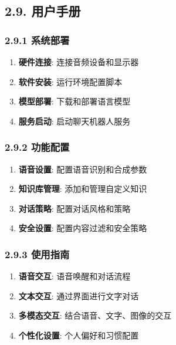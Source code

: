 \subsection{2.9. 用户手册}\label{ux7528ux6237ux624bux518c}

\subsubsection{2.9.1 系统部署}\label{ux7cfbux7edfux90e8ux7f72}

\begin{enumerate}
\def\labelenumi{\arabic{enumi}.}
\tightlist
\item
  \textbf{硬件连接}: 连接音频设备和显示器
\item
  \textbf{软件安装}: 运行环境配置脚本
\item
  \textbf{模型部署}: 下载和部署语言模型
\item
  \textbf{服务启动}: 启动聊天机器人服务
\end{enumerate}

\subsubsection{2.9.2 功能配置}\label{ux529fux80fdux914dux7f6e}

\begin{enumerate}
\def\labelenumi{\arabic{enumi}.}
\tightlist
\item
  \textbf{语音设置}: 配置语音识别和合成参数
\item
  \textbf{知识库管理}: 添加和管理自定义知识
\item
  \textbf{对话策略}: 配置对话风格和策略
\item
  \textbf{安全设置}: 配置内容过滤和安全策略
\end{enumerate}

\subsubsection{2.9.3 使用指南}\label{ux4f7fux7528ux6307ux5357}

\begin{enumerate}
\def\labelenumi{\arabic{enumi}.}
\tightlist
\item
  \textbf{语音交互}: 语音唤醒和对话流程
\item
  \textbf{文本交互}: 通过界面进行文字对话
\item
  \textbf{多模态交互}: 结合语音、文字、图像的交互
\item
  \textbf{个性化设置}: 个人偏好和习惯配置
\end{enumerate}

